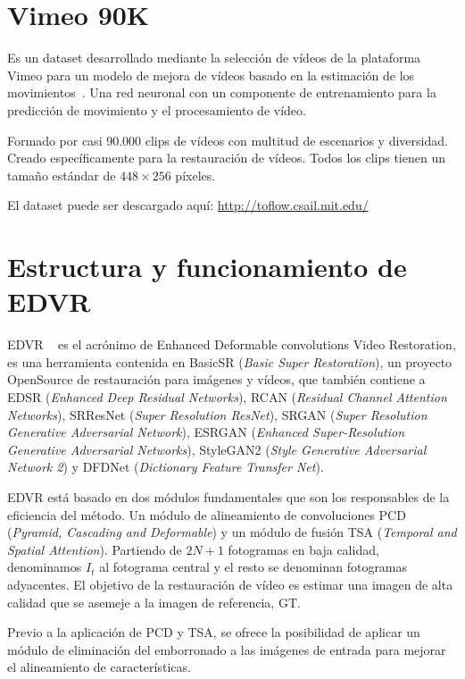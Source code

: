 \section{Vimeo 90K}
    Es un dataset desarrollado mediante la selección de vídeos de la plataforma Vimeo para un modelo de mejora de vídeos basado en la estimación de los movimientos~\cite{xue2019video}. Una red neuronal con un componente de entrenamiento  para la predicción de movimiento y el procesamiento de vídeo.
    
    Formado por casi 90.000 clips de vídeos con multitud de escenarios y diversidad. Creado específicamente para la restauración de vídeos. Todos los clips tienen un tamaño estándar de $448\times 256$ píxeles.
    
    El dataset puede ser descargado aquí: \url{http://toflow.csail.mit.edu/}
    
\section{Estructura y funcionamiento de EDVR}    

    EDVR ~\cite{wang2019edvr} es el acrónimo de Enhanced Deformable convolutions Video Restoration, es una herramienta contenida en BasicSR (\emph{Basic Super Restoration}), un proyecto OpenSource de restauración para imágenes y vídeos, que también contiene a EDSR (\emph{Enhanced Deep Residual Networks}), RCAN (\emph{Residual Channel Attention Networks}), SRResNet (\emph{Super Resolution ResNet}), SRGAN (\emph{Super Resolution Generative Adversarial Network}), ESRGAN (\emph{Enhanced Super-Resolution Generative Adversarial Networks}), StyleGAN2 (\emph{Style Generative Adversarial Network 2}) y DFDNet (\emph{Dictionary Feature Transfer Net}).
    
    EDVR está basado en dos módulos fundamentales que son los responsables de la eficiencia del método. Un módulo de alineamiento de convoluciones PCD (\emph{Pyramid, Cascading and Deformable}) y un módulo de fusión TSA (\emph{Temporal and Spatial Attention}). Partiendo de $2N+1$ fotogramas en baja calidad, denominamos  $I_t$ al fotograma central  y el resto se denominan fotogramas adyacentes. El objetivo de la restauración de vídeo es estimar una imagen de alta calidad que se asemeje a la imagen de referencia, GT.

    
    Previo a la aplicación de PCD y TSA, se ofrece la posibilidad de aplicar un módulo de  eliminación del emborronado a las imágenes de entrada para mejorar el alineamiento de características.
    
